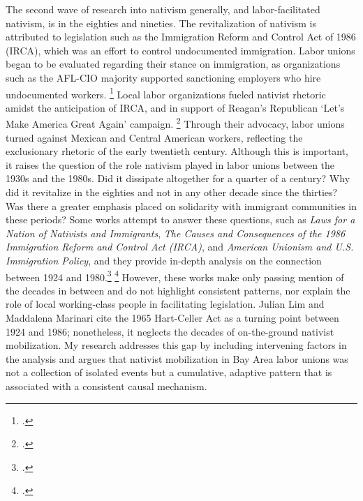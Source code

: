 \documentclass[12pt,a4paper]{article}
\begin{document}
The second wave of research into nativism generally, and labor-facilitated nativism, is in the eighties and nineties. The revitalization of nativism is attributed to legislation such as the Immigration Reform and Control Act of 1986 (IRCA), which was an effort to control undocumented immigration. Labor unions began to be evaluated regarding their stance on immigration, as organizations such as the AFL-CIO majority supported sanctioning employers who hire undocumented workers. \footcite{floyd_organized_nodate} Local labor organizations fueled nativist rhetoric amidst the anticipation of IRCA, and in support of Reagan's Republican `Let's Make America Great Again' campaign. \footcite{murcia_anti-war_2025} Through their advocacy, labor unions turned against Mexican and Central American workers, reflecting the exclusionary rhetoric of the early twentieth century. Although this is important, it raises the question of the role nativism played in labor unions between the 1930s and the 1980s. Did it dissipate altogether for a quarter of a century? Why did it revitalize in the eighties and not in any other decade since the thirties? Was there a greater emphasis placed on solidarity with immigrant communities in these periods? Some works attempt to answer these questions, such as \textit{Laws for a Nation of Nativists and Immigrants}, \textit{The Causes and Consequences of the 1986 Immigration Reform and Control Act (IRCA)}, and \textit{American Unionism and U.S. Immigration Policy}, and they provide in-depth analysis on the connection between 1924 and 1980.\footcites{julian_laws_2019}{bean_causes_2020} \footcite{briggs_jr_american_2001} However, these works make only passing mention of the decades in between and do not highlight consistent patterns, nor explain the role of local working-class people in facilitating legislation. Julian Lim and Maddalena Marinari cite the 1965 Hart-Celler Act as a turning point between 1924 and 1986; nonetheless, it neglects the decades of on-the-ground nativist mobilization. My research addresses this gap by including intervening factors in the analysis and argues that nativist mobilization in Bay Area labor unions was not a collection of isolated events but a cumulative, adaptive pattern that is associated with a consistent causal mechanism.
\end{document}
